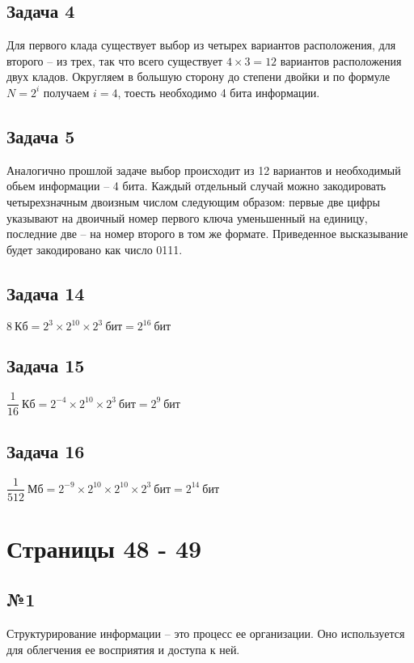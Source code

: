 \documentclass[12pt, a4paper]{article}
\begin{document}
  \subsection{Задача 4}
  Для первого клада существует выбор из четырех вариантов расположения, для второго --
  из трех, так что всего существует $ 4 \times 3 = 12 $ вариантов расположения
  двух кладов. Округляем в большую сторону до степени двойки и по формуле 
  $ N = 2^{i} $ получаем $ i = 4 $, тоесть необходимо 4 бита информации.
  
  \subsection{Задача 5}
  Аналогично прошлой задаче выбор происходит из 12 вариантов и необходимый 
  обьем информации -- 4 бита. Каждый отдельный случай можно закодировать 
  четырехзначным двоизным числом следующим образом: первые две цифры указывают 
  на двоичный номер первого ключа уменьшенный на единицу, последние две -- на 
  номер второго в том же формате. Приведенное высказывание будет закодировано 
  как число 0111.

  \subsection{Задача 14}
  $ 8\ \text{Кб} = 2^{3} \times 2^{10} \times 2^{3}\ \text{бит} = 2^{16}\ \text{бит} $

  \subsection{Задача 15}
  $ \dfrac{1}{16}\ \text{Кб} = 2^{-4} \times 2^{10} \times 2^{3}\ \text{бит} = 2^{9}\ \text{бит} $

  \subsection{Задача 16}
  $ \dfrac{1}{512}\ \text{Мб} = 2^{-9} \times 2^{10} \times 2^{10} \times 2^{3}\ \text{бит} 
    = 2^{14}\ \text{бит} $
  

  \section{Страницы 48 - 49}
  \subsection{№1}
  Структурирование информации -- это процесс ее организации.
  Оно используется для облегчения ее восприятия и доступа к ней.
\end{document}

